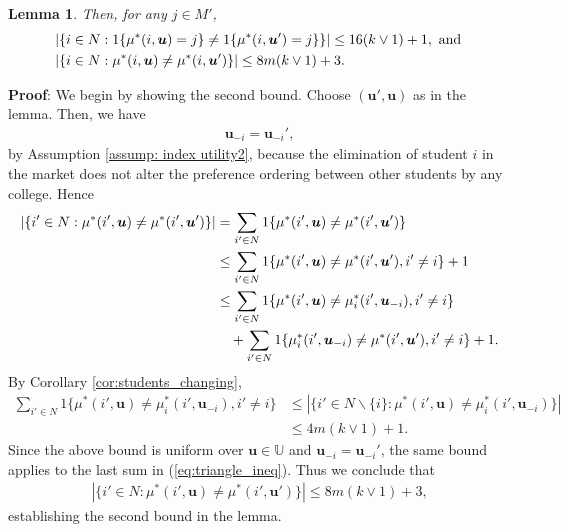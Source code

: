 \documentclass[12pt, fullpage]{amsart}
\newtheorem{lemma}{Lemma}[section]
\theoremstyle{definition}
\theoremstyle{definition}
\theoremstyle{definition}
\begin{document}
\begin{bibunit}[econometrica]
\begin{lemma}
Then, for any $j  \in M'$,
	\begin{align}
		\label{eq:5pt1ii2-1-1-2}
		&\left|\left\{i\in N:1\{\mu^{*}(i,\boldsymbol{u}) = j\} \ne  1\{\mu^{*}(i,\boldsymbol{u}') = j\}\right\} \right|\leq 16(k\vee1) +1, \text{ and } \\\notag
		&\left|\{i\in N:\mu^{*}(i,\boldsymbol{u})\neq\mu^*(i,\boldsymbol{u}')\}\right|\leq 8m(k\vee1)+3.
	\end{align}
\end{lemma}

\noindent \textbf{Proof}:
We begin by showing the second bound. Choose $(\boldsymbol{u}',\boldsymbol{u})$ as in the lemma. Then, we have
\begin{align*}
	\boldsymbol{u}_{-i} = \boldsymbol{u}_{-i}',
\end{align*}
by Assumption \ref{assump: index utility2}, because the elimination of student $i$ in the market does not alter the preference ordering between other students by any college. Hence
\begin{align}
	\left|\{i'\in N:\mu^*(i',\boldsymbol{u})\neq\mu^*(i',\boldsymbol{u}')\}\right| & =\sum_{i'\in N}1\{\mu^*(i',\boldsymbol{u})\ne\mu^*(i',\boldsymbol{u}')\}\label{eq:triangle_ineq}\\ \notag
	&\le \sum_{i'\in N}1\{\mu^*(i',\boldsymbol{u})\ne\mu^*(i',\boldsymbol{u}'),i' \ne i\} + 1\\
	& \leq \sum_{i'\in N}1\{\mu^*(i',\boldsymbol{u})\ne \mu_{i}^*(i',\boldsymbol{u}_{-i}), i' \ne i\}\nonumber \\
	& \quad +\sum_{i'\in N}1\{\mu_{i}^*(i',\boldsymbol{u}_{-i})\ne\mu^*(i',\boldsymbol{u}'), i' \ne i\} + 1.\nonumber 
\end{align}
By Corollary \ref{cor:students_changing},
\begin{align*}
	\sum_{i'\in N}1\{\mu^*(i',\boldsymbol{u})\ne \mu_{i}^*(i',\boldsymbol{u}_{-i}), i' \ne i\} & \leq|\{i'\in N\backslash\{i\}:\mu^*(i',\boldsymbol{u})\neq\mu_{i}^*(i',\boldsymbol{u}_{-i})\}|\\
	& \leq 4m(k\vee1)+1.
\end{align*}
Since the above bound is uniform over $\boldsymbol{u}\in\mathbb{U}$ and $\boldsymbol{u}_{-i} = \boldsymbol{u}_{-i}'$, the same bound applies to the last sum in (\ref{eq:triangle_ineq}). Thus we conclude that 
\begin{align*}
	\left|\{i'\in N:\mu^*(i',\boldsymbol{u})\neq\mu^*(i',\boldsymbol{u}')\}\right|  \leq8 m(k\vee 1) + 3,
\end{align*}
establishing the second bound in the lemma.


\end{bibunit}
\end{document}
